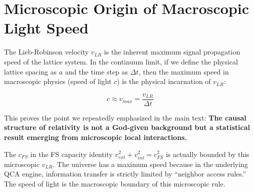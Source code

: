 \section{Microscopic Origin of Macroscopic Light Speed}

The Lieb-Robinson velocity $v_{LR}$ is the inherent maximum signal propagation speed of the lattice system. In the continuum limit, if we define the physical lattice spacing as $a$ and the time step as $\Delta t$, then the maximum speed in macroscopic physics (speed of light $c$) is the physical incarnation of $v_{LR}$:

\[c \approx v_{max} = \frac{v_{LR}}{\Delta t}\]

This proves the point we repeatedly emphasized in the main text: \textbf{The causal structure of relativity is not a God-given background but a statistical result emerging from microscopic local interactions.}

The $c_{FS}$ in the FS capacity identity $v_{ext}^2 + v_{int}^2 = c_{FS}^2$ is actually bounded by this microscopic $v_{LR}$. The universe has a maximum speed because in the underlying QCA engine, information transfer is strictly limited by ``neighbor access rules.'' The speed of light is the macroscopic boundary of this microscopic rule.

